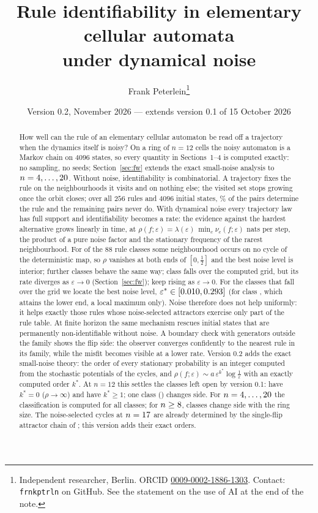 \documentclass[11pt,a4paper]{article}
\title{Rule identifiability in elementary cellular automata\\under dynamical noise}
\author{Frank Peterlein\thanks{Independent researcher, Berlin. ORCID \href{https://orcid.org/0009-0002-1886-1303}{0009-0002-1886-1303}. Contact: \texttt{frnkptrln} on GitHub. See the statement on the use of AI at the end of the note.}}
\date{Version 0.2, November 2026 --- extends version 0.1 of 15 October 2026}
\theoremstyle{remark}
\newcommand{\eps}{\varepsilon}
\begin{document}
\maketitle

\begin{abstract}
\noindent
How well can the rule of an elementary cellular automaton be read off a trajectory when the dynamics itself is noisy? On a ring of $n=12$ cells the noisy automaton is a Markov chain on $4096$ states, so every quantity in Sections~1--4 is computed exactly: no sampling, no seeds; Section~\ref{sec:fw} extends the exact small-noise analysis to $n=4,\dots,20$. Without noise, identifiability is combinatorial. A trajectory fixes the rule on the neighbourhoods it visits and on nothing else; the visited set stops growing once the orbit closes; over all $256$ rules and $4096$ initial states, \ZeroFracFullAll\% of the pairs determine the rule and the remaining pairs never do. With dynamical noise every trajectory law has full support and identifiability becomes a rate: the evidence against the hardest alternative grows linearly in time, at $\rho(f;\eps)=\lambda(\eps)\,\min_c\nu_c(f;\eps)$ nats per step, the product of a pure noise factor and the stationary frequency of the rarest neighbourhood. For \NumClassesBproved{} of the $88$ rule classes some neighbourhood occurs on no cycle of the deterministic map, so $\rho$ vanishes at both ends of $[0,\tfrac12]$ and the best noise level is interior; \NumUfallingVtwo{} further classes behave the same way; class \FlipRules{} falls over the computed grid, but its rate diverges as $\eps\to0$ (Section~\ref{sec:fw}); \NumRisingU{} keep rising as $\eps\to0$. For the \NumInterior{} classes that fall over the grid we locate the best noise level, $\eps^*\in[\EpsStarMin,\EpsStarMax]$ (for class \FlipRules, which attains the lower end, a local maximum only). Noise therefore does not help uniformly: it helps exactly those rules whose noise-selected attractors exercise only part of the rule table. At finite horizon the same mechanism rescues initial states that are permanently non-identifiable without noise. A boundary check with generators outside the family shows the flip side: the observer converges confidently to the nearest rule in its family, while the misfit becomes visible at a lower rate. Version 0.2 adds the exact small-noise theory: the order of every stationary probability is an integer computed from the stochastic potentials of the cycles, and $\rho(f;\eps)\sim a\,\eps^{k^*}\log\frac1\eps$ with an exactly computed order $k^*$. At $n=12$ this settles the \NumUclasses{} classes left open by version 0.1: \NumUrisingVtwo{} have $k^*=0$ ($\rho\to\infty$) and \NumUfallingVtwo{} have $k^*\ge1$; one class (\FlipRules) changes side. For $n=4,\dots,20$ the classification is computed for all classes; for $n\ge8$, \SweepVaryCount{} classes change side with the ring size. The noise-selected cycles at $n=17$ are already determined by the single-flip attractor chain of \citet{Bagnoli2024}; this version adds their exact orders.
\end{abstract}
\end{document}
